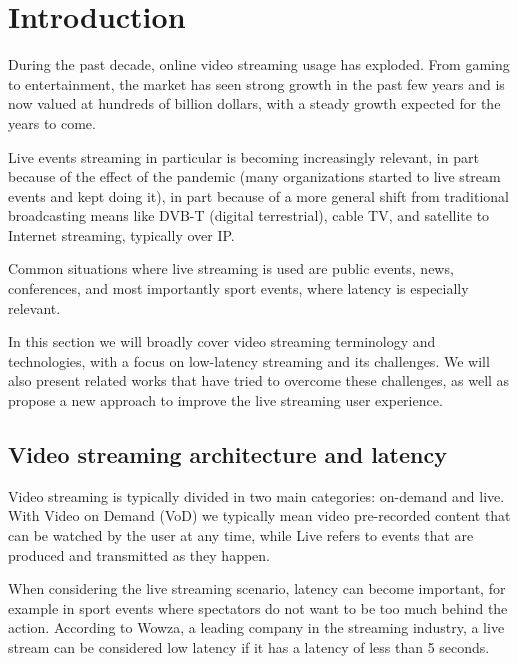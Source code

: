
\chapter{Introduction}
\label{cha:intro}

During the past decade, online video streaming usage has exploded. From gaming to entertainment, the market has seen strong growth in the past few years and is now valued at hundreds of billion dollars, with a steady growth expected for the years to come.\cite{cisco2019}



Live events streaming in particular is becoming increasingly relevant, in part because of the effect of the pandemic (many organizations started to live stream events and kept doing it), in part because of a more general shift from traditional broadcasting means like DVB-T (digital terrestrial), cable TV, and satellite to Internet streaming, typically over IP.

Common situations where live streaming is used are public events, news, conferences, and most importantly sport events, where latency is especially relevant.

In this section we will broadly cover video streaming terminology and technologies, with a focus on low-latency streaming and its challenges. We will also present related works that have tried to overcome these challenges, as well as propose a new approach to improve the live streaming user experience.

\section{Video streaming architecture and latency}
\label{sec:intro/architecture}

Video streaming is typically divided in two main categories: on-demand and live. With Video on Demand (VoD) we typically mean video pre-recorded content that can be watched by the user at any time, while Live refers to events that are produced and transmitted as they happen.

When considering the live streaming scenario, latency can become important, for example in sport events where spectators do not want to be too much behind the action. According to Wowza, a leading company in the streaming industry, a live stream can be considered low latency if it has a latency of less than 5 seconds.

